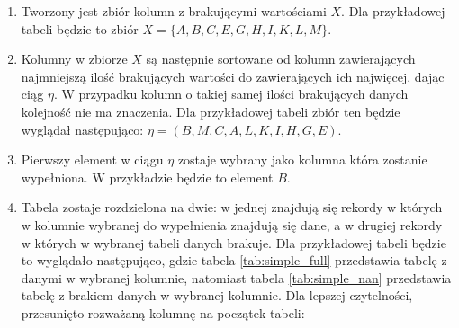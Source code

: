\documentclass[12pt,twoside]{article}
\begin{document}
\begin{enumerate}[label=\arabic*), leftmargin=1.25cm]
    \item Tworzony jest zbiór kolumn z brakującymi wartościami $X$.
    Dla przykładowej tabeli będzie to zbiór $X=\{A,B,C,E,G,H,I,K,L,M\}$.
    \item Kolumny w zbiorze $X$ są następnie sortowane od kolumn zawierających
    najmniejszą ilość brakujących wartości do zawierających ich najwięcej, dając ciąg $\eta$.
    W przypadku kolumn o takiej samej ilości brakujących danych kolejność nie ma znaczenia.
    Dla przykładowej tabeli zbiór ten będzie wyglądał następująco: $\eta=(B,M,C,A,L,K,I,H,G,E)$.
    \item Pierwszy element w ciągu $\eta$ zostaje wybrany jako kolumna która zostanie wypełniona.
    W przykładzie będzie to element $B$.
    \item Tabela zostaje rozdzielona na dwie: w jednej znajdują się rekordy
    w których w kolumnie wybranej do wypełnienia znajdują się dane,
    a w drugiej rekordy w których w wybranej tabeli danych brakuje.
    Dla przykładowej tabeli będzie to wyglądało następująco,
    gdzie tabela \ref{tab:simple_full} przedstawia tabelę z danymi w wybranej kolumnie,
    natomiast tabela \ref{tab:simple_nan} przedstawia tabelę z brakiem danych w wybranej kolumnie.
    Dla lepszej czytelności, przesunięto rozważaną kolumnę na początek tabeli:


\end{enumerate}
\end{document}
